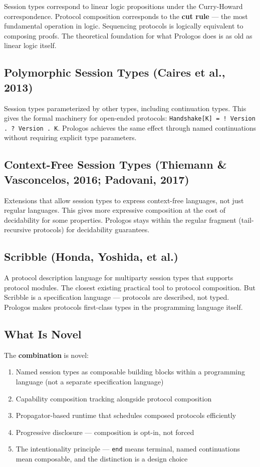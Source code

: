\documentclass[11pt]{article}
\begin{document}
Session types correspond to linear logic propositions under the Curry-Howard
correspondence. Protocol composition corresponds to the \textbf{cut rule} --- the
most fundamental operation in logic. Sequencing protocols is logically
equivalent to composing proofs. The theoretical foundation for what Prologos
does is as old as linear logic itself.
\subsection{Polymorphic Session Types (Caires et al., 2013)}
\label{sec:org3334997}

Session types parameterized by other types, including continuation types. This
gives the formal machinery for open-ended protocols:
\texttt{Handshake[K] = ! Version . ? Version . K}. Prologos achieves the same
effect through named continuations without requiring explicit type parameters.
\subsection{Context-Free Session Types (Thiemann \& Vasconcelos, 2016; Padovani, 2017)}
\label{sec:org496050b}

Extensions that allow session types to express context-free languages, not
just regular languages. This gives more expressive composition at the cost of
decidability for some properties. Prologos stays within the regular fragment
(tail-recursive protocols) for decidability guarantees.
\subsection{Scribble (Honda, Yoshida, et al.)}
\label{sec:orga195220}

A protocol description language for multiparty session types that supports
protocol modules. The closest existing practical tool to protocol composition.
But Scribble is a specification language --- protocols are described, not typed.
Prologos makes protocols first-class types in the programming language itself.
\subsection{What Is Novel}
\label{sec:orgc6e0047}

The \textbf{combination} is novel:

\begin{enumerate}
\item Named session types as composable building blocks within a programming
language (not a separate specification language)
\item Capability composition tracking alongside protocol composition
\item Propagator-based runtime that schedules composed protocols efficiently
\item Progressive disclosure --- composition is opt-in, not forced
\item The intentionality principle --- \texttt{end} means terminal, named continuations
mean composable, and the distinction is a design choice
\end{enumerate}
\end{document}
